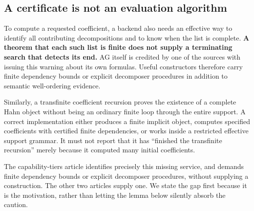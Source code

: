 \documentclass[11pt,letterpaper]{article}
\numberwithin{equation}{section}
\theoremstyle{definition}
\theoremstyle{remark}
\begin{document}
\subsection{A certificate is not an evaluation algorithm}
\label{cas:sub-notalgorithm}
To compute a requested coefficient, a backend also needs an effective way to
identify all contributing decompositions and to know when the list is complete.
\textbf{A theorem that each such list is finite does not supply a terminating
search that detects its end.} AG itself is credited by one of the sources with
issuing this warning about its own formulas. Useful constructors therefore carry
finite dependency bounds or explicit decomposer procedures in addition to
semantic well-ordering evidence.

Similarly, a transfinite coefficient recursion proves the existence of a
complete Hahn object without being an ordinary finite loop through the entire
support. A correct implementation either produces a finite implicit object,
computes specified coefficients with certified finite dependencies, or works
inside a restricted effective support grammar. It must not report that it has
``finished the transfinite recursion'' merely because it computed many initial
coefficients.

The capability-tiers article identifies precisely this missing service, and
demands finite dependency bounds or explicit decomposer procedures, without
supplying a construction. The other two articles supply one. We state the gap
first because it is the motivation, rather than letting the lemma below silently
absorb the caution.
\end{document}
